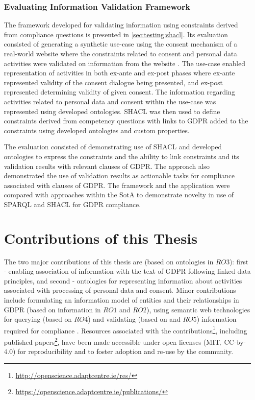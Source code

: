 \subsubsection{Evaluating Information Validation Framework}
The framework developed for validating information using constraints derived from compliance questions is presented in \autoref{sec:testing:shacl}.
Its evaluation consisted of generating a synthetic use-case using the consent mechanism of a real-world website where the constraints related to consent and personal data activities were validated on information from the website .
The use-case enabled representation of activities in both ex-ante and ex-post phases where ex-ante represented validity of the consent dialogue being presented, and ex-post represented determining validity of given consent.
The information regarding activities related to personal data and consent within the use-case was represented using developed ontologies.
SHACL was then used to define constraints derived from competency questions with links to GDPR added to the constraints using developed ontologies and custom properties.

The evaluation consisted of demonstrating use of SHACL and developed ontologies to express the constraints and the ability to link constraints and its validation results with relevant clauses of GDPR.
The approach also demonstrated the use of validation results as actionable tasks for compliance associated with clauses of GDPR.
The framework and the application were compared with approaches within the SotA to demonstrate novelty in use of SPARQL and SHACL for GDPR compliance.

\section{Contributions of this Thesis}\label{sec:intro:contributions}
The two major contributions of this thesis are (based on ontologies in $RO3$): first - enabling association of information with the text of GDPR following linked data principles, and second - ontologies for representing information about activities associated with processing of personal data and consent. Minor contributions include formulating an information model of entities and their relationships in GDPR (based on information in $RO1$ and $RO2$), using semantic web technologies for querying (based on $RO4$) and validating (based on and $RO5$) information required for compliance . Resources associated with the contributions\footnote{\url{http://openscience.adaptcentre.ie/res/}}, including published papers\footnote{\url{https://openscience.adaptcentre.ie/publications/}}, have been made accessible under open licenses (MIT,  CC-by-4.0) for reproducibility and to foster adoption and re-use by the community.

